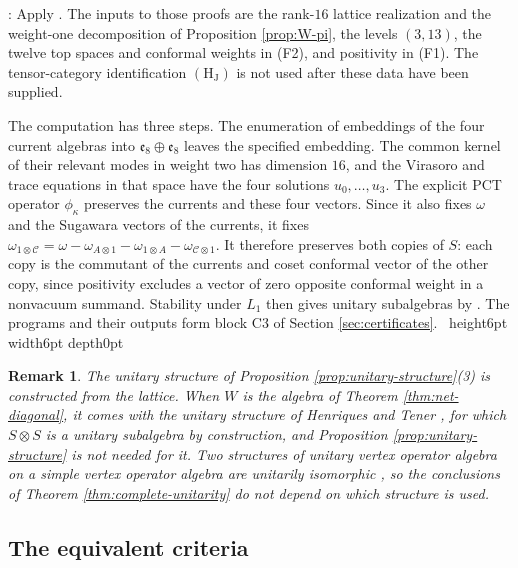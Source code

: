 \documentclass[leqno]{article}
\newcommand{\scr}{\mathscr}
\newcommand{\qed}{\hfill \vrule height6pt  width6pt depth0pt}
\newcommand{\ot}{\otimes}
\newtheorem{remark}[thm]{Remark}
\newenvironment{proof}[1][]{\noindent {\it Proof #1} : }{\hbox{~}\qed
\smallskip
}
\numberwithin{equation}{section}
\begin{document}
\begin{proof}
Apply \cite[Lemmas 7.14--7.15 and Proposition 7.16]{ArhII}. The inputs to those proofs are the rank-$16$ lattice realization and the weight-one decomposition of Proposition \ref{prop:W-pi}, the levels $(3,13)$, the twelve top spaces and conformal weights in (F2), and positivity in (F1). The tensor-category identification $\mathrm{(H_J)}$ is not used after these data have been supplied.

The computation has three steps. The enumeration of embeddings of the four current algebras into $\mathfrak e_8\oplus\mathfrak e_8$ leaves the specified embedding. The common kernel of their relevant modes in weight two has dimension $16$, and the Virasoro and trace equations in that space have the four solutions $u_0,\ldots,u_3$. The explicit PCT operator $\phi_\kappa$ preserves the currents and these four vectors. Since it also fixes $\omega$ and the Sugawara vectors of the currents, it fixes $\omega_{1 \ot \scr C} = \omega-\omega_{A \ot 1}-\omega_{1 \ot A}-\omega_{\scr C \ot 1}$. It therefore preserves both copies of $S$: each copy is the commutant of the currents and coset conformal vector of the other copy, since positivity excludes a vector of zero opposite conformal weight in a nonvacuum summand. Stability under $L_1$ then gives unitary subalgebras by \cite[Proposition 5.23]{CKLW18}. The programs and their outputs form block C3 of Section \ref{sec:certificates}.
\end{proof}

\begin{remark}\normalfont
\label{rem:HT-structure}
The unitary structure of Proposition \ref{prop:unitary-structure}(3) is constructed from the lattice. When $W$ is the algebra of Theorem \ref{thm:net-diagonal}, it comes with the unitary structure of Henriques and Tener \cite{HeT25}, for which $S \ot S$ is a unitary subalgebra by construction, and Proposition \ref{prop:unitary-structure} is not needed for it. Two structures of unitary vertex operator algebra on a simple vertex operator algebra are unitarily isomorphic \cite[Proposition 5.19 pp.~40--41]{CKLW18}, so the conclusions of Theorem \ref{thm:complete-unitarity} do not depend on which structure is used.
\end{remark}


\subsection{The equivalent criteria}
\end{document}
